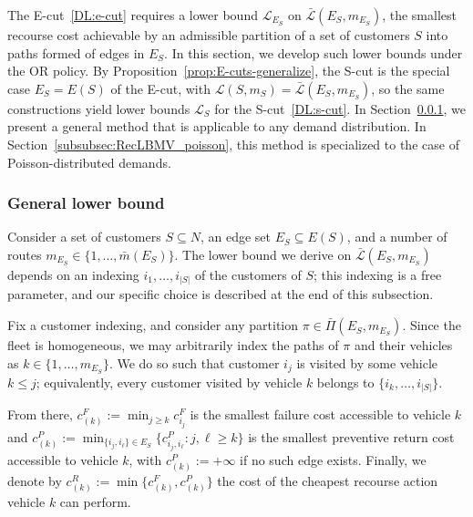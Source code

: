 \documentclass{article}
\newcommand{\rev}[1]{{\color{black}#1}}
\begin{document}
The E-cut~\eqref{DL:e-cut} requires a lower bound $\mathcal{L}_{E_S}$ on $\bar{\mathcal{L}}(E_S, m_{E_S})$, the smallest recourse cost achievable by an admissible partition of a set of customers $S$ into paths formed of edges in $E_S$. In this section, we develop such lower bounds under the OR policy. \rev{By Proposition~\ref{prop:E-cuts-generalize}, the S-cut is the special case $E_S = E(S)$ of the E-cut, with $\mathcal{L}(S, m_S) = \bar{\mathcal{L}}(E_S, m_{E_S})$, so the same constructions yield lower bounds $\mathcal{L}_S$ for the S-cut~\eqref{DL:s-cut}.} In Section~\ref{subsubsec:RecLBMV_all}, we present a general method that is applicable to any demand distribution. In Section~\ref{subsubsec:RecLBMV_poisson}, this method is specialized to the case of Poisson-distributed demands.
 
\subsubsection{General lower bound} \label{subsubsec:RecLBMV_all}
Consider a set of customers $S \subseteq N$, \rev{an edge set $E_S \subseteq E(S)$}, and a number of routes $m_{E_S} \in \{1,\dots,\bar{m}(E_S)\}$. The lower bound we derive on $\bar{\mathcal{L}}(E_S, m_{E_S})$ depends on an indexing $i_1, \dots, i_{|S|}$ of the customers of $S$; this indexing is a free parameter, and our specific choice is described at the end of this subsection.

Fix a customer indexing, and consider any partition $\pi \in \bar{\Pi}(E_S, m_{E_S})$. Since the fleet is homogeneous, we may arbitrarily index the paths of $\pi$ and their vehicles as $k \in \{1,\dots,m_{E_S}\}$. We do so such that customer $i_j$ is visited by some vehicle $k \leq j$; equivalently, every customer visited by vehicle $k$ belongs to $\{i_k,\dots,i_{|S|}\}$. 
 
From there, $c^F_{(k)} := \min_{j \geq k} c^F_{i_j}$ is the smallest failure cost accessible to vehicle $k$ and \rev{$c^P_{(k)} := \min_{\{i_j,i_\ell\} \in E_S} \{ c^P_{i_j,i_\ell} : j,\ell \geq k \}$ is the smallest preventive return cost accessible to vehicle $k$, with $c^P_{(k)} := +\infty$ if no such edge exists}. Finally, we denote by $c^R_{(k)} := \min\{c^F_{(k)},c^P_{(k)}\}$ the cost of the cheapest recourse action vehicle $k$ can perform.
\end{document}
